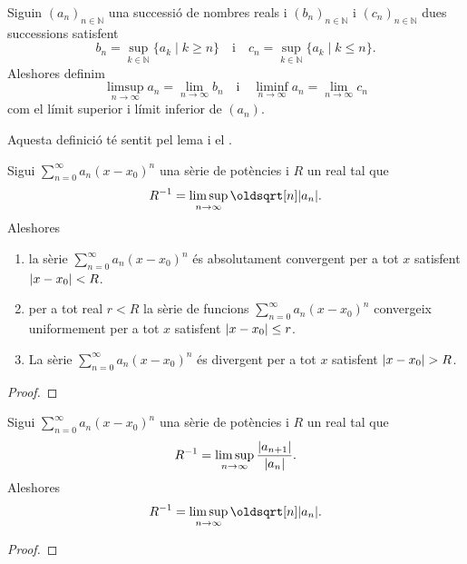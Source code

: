 \documentclass[../../Main.tex]{subfiles}
\begin{document}
	\begin{definition}
		\label{def:límit superior d'una successió}
		\label{def:límit inferior d'una successió}
		Siguin \((a_{n})_{n\in\mathbb{N}}\) una successió de nombres reals i \((b_{n})_{n\in\mathbb{N}}\) i \((c_{n})_{n\in\mathbb{N}}\) dues successions satisfent
		\[b_{n}=\sup_{k\in\mathbb{N}}\{a_{k}\mid k\geq n\}\quad\text{i}\quad c_{n}=\sup_{k\in\mathbb{N}}\{a_{k}\mid k\leq n\}.\]
		Aleshores definim
		\[\limsup_{n\to\infty}a_{n}=\lim_{n\to\infty}b_{n}\quad\text{i}\quad\liminf_{n\to\infty}a_{n}=\lim_{n\to\infty}c_{n}\]
		com el límit superior i límit inferior de \((a_{n})\).
		
		Aquesta definició té sentit pel lema  i el \corollari{} .
	\end{definition}
	\begin{theorem}
		\label{thm:radi de convergència d'una sèrie de potències}
		Sigui \(\sum_{n=0}^{\infty}a_{n}(x-x_{0})^{n}\) una sèrie de potències i \(R\) un real tal que
		\[R^{-1}=\limsup_{n\to\infty}\sqrt[n]{\abs{a_{n}}}.\]
		Aleshores
		\begin{enumerate}
			\item\label{thm:radi de convergència d'una sèrie de potències:enum1} la sèrie \(\sum_{n=0}^{\infty}a_{n}(x-x_{0})^{n}\) és absolutament convergent per a tot \(x\) satisfent \(\abs{x-x_{0}}<R\).
			\item\label{thm:radi de convergència d'una sèrie de potències:enum2} per a tot real \(r<R\) la sèrie de funcions \(\sum_{n=0}^{\infty}a_{n}(x-x_{0})^{n}\) convergeix uniformement per a tot \(x\) satisfent \(\abs{x-x_{0}}\leq r\).
			\item\label{thm:radi de convergència d'una sèrie de potències:enum3} La sèrie \(\sum_{n=0}^{\infty}a_{n}(x-x_{0})^{n}\) és divergent per a tot \(x\) satisfent \(\abs{x-x_{0}}>R\).
		\end{enumerate}
		\begin{proof}
		\end{proof}
	\end{theorem}
	\begin{proposition}
		\label{prop:quocient per calcular radis de convergència de sèries de potències}
		Sigui \(\sum_{n=0}^{\infty}a_{n}(x-x_{0})^{n}\) una sèrie de potències i \(R\) un real tal que
		\[R^{-1}=\limsup_{n\to\infty}\frac{\abs{a_{n+1}}}{\abs{a_{n}}}.\]
		Aleshores
		\[R^{-1}=\limsup_{n\to\infty}\sqrt[n]{\abs{a_{n}}}.\]
		\begin{proof}
		\end{proof}
	\end{proposition}
\end{document}
